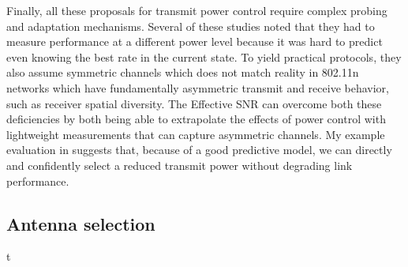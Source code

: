 Finally, all these proposals for transmit power control require complex probing and adaptation mechanisms. Several of these studies noted that they had to measure performance at a different power level because it was hard to predict even knowing the best rate in the current state. To yield practical protocols, they also assume symmetric channels which does not match reality in 802.11n networks which have fundamentally asymmetric transmit and receive behavior, such as receiver spatial diversity. The Effective SNR can overcome both these deficiencies by both being able to extrapolate the effects of power control with lightweight measurements that can capture asymmetric channels. My example evaluation in  suggests that, because of a good predictive model, we can directly and confidently select a reduced transmit power without degrading link performance.

\subsection{Antenna selection}t

\ifx\mainfile\undefined

\fi
